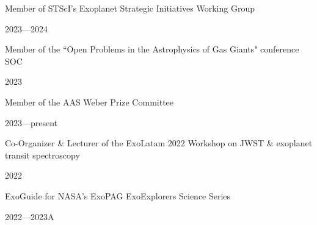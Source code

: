\documentclass[12pt, a4paper]{article} %
\begin{document}
\begin{minipage}[t]{0.7\textwidth}
\begin{flushleft}%
  \setlength{\leftskip}{0.2cm}%
Member of STScI's Exoplanet Strategic Initiatives Working Group
\end{flushleft}
\end{minipage}
\begin{minipage}[t]{0.3\textwidth}
\hfill 2023---2024
\end{minipage}

\vspace{0.2cm}

\begin{minipage}[t]{0.7\textwidth}
\begin{flushleft}%
  \setlength{\leftskip}{0.2cm}%
Member of the ``Open Problems in the Astrophysics of Gas Giants" conference SOC
\end{flushleft}
\end{minipage}
\begin{minipage}[t]{0.3\textwidth}
\hfill 2023
\end{minipage}

\vspace{0.3cm}

\begin{minipage}[t]{0.7\textwidth}
\begin{flushleft}%
  \setlength{\leftskip}{0.2cm}%
Member of the AAS Weber Prize Committee
\end{flushleft}
\end{minipage}
\begin{minipage}[t]{0.3\textwidth}
\hfill 2023---present
\end{minipage}

\vspace{0.2cm}

\begin{minipage}[t]{0.7\textwidth}
\begin{flushleft}%
  \setlength{\leftskip}{0.2cm}%
Co-Organizer \& Lecturer of the ExoLatam 2022 Workshop on JWST \& exoplanet transit spectroscopy
\end{flushleft}
\end{minipage}
\begin{minipage}[t]{0.3\textwidth}
\hfill 2022
\end{minipage}

\vspace{0.2cm}

\begin{minipage}[t]{0.7\textwidth}
\begin{flushleft}%
  \setlength{\leftskip}{0.2cm}%
ExoGuide for NASA's ExoPAG ExoExplorers Science Series
\end{flushleft}
\end{minipage}
\begin{minipage}[t]{0.3\textwidth}
\hfill 2022---2023A
\end{minipage}
\end{document}
